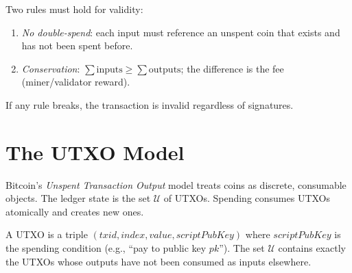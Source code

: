Two rules must hold for validity:
\begin{enumerate}[label=(\roman*)]
    \item \emph{No double-spend}: each input must reference an unspent coin that exists and has not been spent before.
    \item \emph{Conservation}: $\sum \text{inputs} \ge \sum \text{outputs}$; the difference is the fee (miner/validator reward).
\end{enumerate}
If any rule breaks, the transaction is invalid regardless of signatures.

\section{The UTXO Model}\label{sec:utxo}
Bitcoin's \emph{Unspent Transaction Output} model treats coins as discrete, consumable objects. The ledger state is the set $\mathcal{U}$ of UTXOs. Spending consumes UTXOs atomically and creates new ones.

\begin{definition}[UTXO]\label{def:utxo}
A UTXO is a triple $(txid, index, value, scriptPubKey)$ where $scriptPubKey$ is the spending condition (e.g., ``pay to public key $pk$''). The set $\mathcal{U}$ contains exactly the UTXOs whose outputs have not been consumed as inputs elsewhere.
\end{definition}

